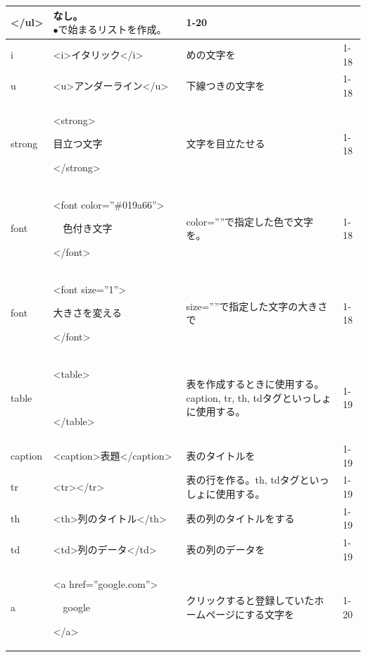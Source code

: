 \documentclass[a4paper,12pt]{jarticle}
\begin{document}
{\begin{center}
\begin{supertabular}{|m{1.6cm}|m{5.1060004cm}|m{7.8930006cm}|m{2.037cm}|}
      {\textless}/ul{\textgreater} &
      なし。${\bullet}で始まるリストを作成。$
      &
      1-20\\\hline
      i &
      {\textless}i{\textgreater}イタリック{\textless}/i{\textgreater} &
      めの文字を &
      1-18\\\hline
      u &
      {\textless}u{\textgreater}アンダーライン{\textless}/u{\textgreater} &
      下線つきの文字を &
      1-18\\\hline
      strong &
      {\textless}strong{\textgreater}

      目立つ文字

      {\textless}/strong{\textgreater} &
      文字を目立たせる &
      1-18\\\hline
      font  &
      {\textless}font color=”\#019a66”{\textgreater}

      \ \ 色付き文字

      {\textless}/font{\textgreater} &
      color=””で指定した色で文字を。 &
      1-18\\\hline
      font &
      {\textless}font size=”1”{\textgreater}

      大きさを変える

      {\textless}/font{\textgreater} &
      size=””で指定した文字の大きさで &
      1-18\\\hline
      table &
      {\textless}table{\textgreater}

      ~

      {\textless}/table{\textgreater} &
      表を作成するときに使用する。caption, tr, th,
      tdタグといっしょに使用する。 &
      1-19\\\hline
      caption &
      {\textless}caption{\textgreater}表題{\textless}/caption{\textgreater} &
      表のタイトルを &
      1-19\\\hline
      tr &
      {\textless}tr{\textgreater}{\textless}/tr{\textgreater} &
      表の行を作る。th,
      tdタグといっしょに使用する。 &
      1-19\\\hline
      th &
      {\textless}th{\textgreater}列のタイトル{\textless}/th{\textgreater} &
      表の列のタイトルをする &
      1-19\\\hline
      td &
      {\textless}td{\textgreater}列のデータ{\textless}/td{\textgreater} &
      表の列のデータを &
      1-19\\\hline
      a &
      {\textless}a href=”google.com”{\textgreater}

      \ \ google

        {\textless}/a{\textgreater} &
      クリックすると登録していたホームページにする文字を
      &
      1-20\\\hline
    \end{supertabular}
  \end{center}
}
\end{document}
